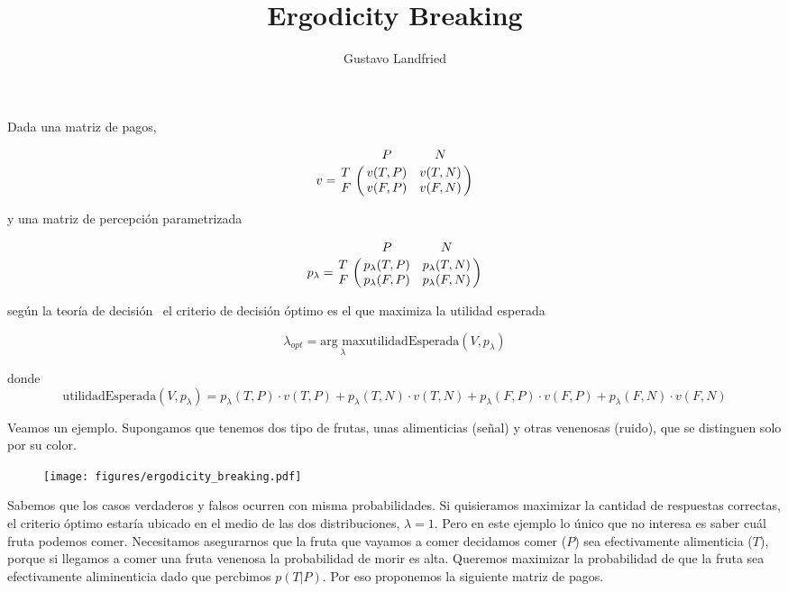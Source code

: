 \documentclass[a4paper,10pt]{article}
\title{ Ergodicity Breaking}
\author{Gustavo Landfried}
\affil{\small Universidad de Buenos Aires. Facultad de Ciencias Exactas y Naturales. Departamento de Computaci\'on. Buenos Aires, Argentina}
\affil[]{Correspondencia: \url{gustavolandfried@gmail.com}}
\begin{document}
\maketitle

Dada una matriz de pagos,

\begin{equation}
 v = \bordermatrix{ & P & N  \cr
      T & v(T,P) & v(T,N)  \cr
      F & v(F,P) & v(F,N)  \cr} 
\end{equation}

y una matriz de percepci\'on parametrizada

\begin{equation}
 p_{\lambda} = \bordermatrix{ & P & N  \cr
      T & p_{\lambda}(T,P) & p_{\lambda}(T,N)  \cr
      F & p_{\lambda}(F,P) & p_{\lambda}(F,N)  \cr} 
\end{equation}

seg\'un la teor\'ia de decisi\'on~\cite{gardner2019-optimalityDecisionTheory} el criterio de decisi\'on \'optimo es el que maximiza la utilidad esperada

\begin{equation}
 \lambda_{opt} = \underset{\lambda}{\text{arg max}} \text{utilidadEsperada}(V,p_{\lambda})
\end{equation}

donde 
\begin{equation*}
\text{utilidadEsperada}(V,p_{\lambda}) =  p_{\lambda}(T,P)\cdot v(T,P) + p_{\lambda}(T,N)\cdot v(T,N) + p_{\lambda}(F,P)\cdot v(F,P) + p_{\lambda}(F,N)\cdot v(F,N) 
\end{equation*}

Veamos un ejemplo.
Supongamos que tenemos dos tipo de frutas, unas alimenticias (señal) y otras venenosas (ruido), que se distinguen solo por su color. 

\begin{figure}[H]
\centering
  \texttt{[image: figures/ergodicity\_breaking.pdf]}
  \caption{}
  \label{}
\end{figure}

Sabemos que los casos verdaderos y falsos ocurren con misma probabilidades.
Si quisieramos maximizar la cantidad de respuestas correctas, el criterio \'optimo estar\'ia ubicado en el medio de las dos distribuciones, $\lambda = 1$.
Pero en este ejemplo lo \'unico que no interesa es saber cuál fruta podemos comer. 
Necesitamos asegurarnos que la fruta que vayamos a comer decidamos comer ($P$) sea efectivamente alimenticia ($T$), porque si llegamos a comer una fruta venenosa la probabilidad de morir es alta.
Queremos maximizar la probabilidad de que la fruta sea efectivamente aliminenticia dado que percbimos $p(T|P)$.
Por eso proponemos la siguiente matriz de pagos.
\end{document}
